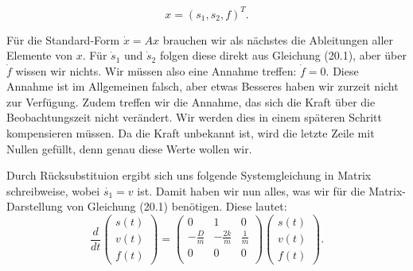 \[ 
 x = (s_1, s_2, f)^T.
\] 
  
Für die Standard-Form $\dot x = Ax$ brauchen wir als nächstes die Ableitungen aller Elemente von $x$. Für $\dot s_1$ und $\dot s_2$ folgen diese direkt aus Gleichung (20.1), aber über $\dot f$ wissen wir nichts. 
Wir müssen also eine Annahme treffen: $\dot f = 0$. Diese Annahme ist im Allgemeinen falsch, aber etwas Besseres haben wir zurzeit nicht zur Verfügung. 
Zudem treffen wir die Annahme, das sich die Kraft über die Beobachtungszeit nicht verändert.
Wir werden dies in einem späteren Schritt kompensieren müssen.
Da die Kraft unbekannt ist, wird die letzte Zeile mit Nullen gefüllt, denn genau diese Werte wollen wir. 


Durch Rücksubstituion ergibt sich uns folgende Systemgleichung in Matrix schreibweise, wobei $\dot {s_1}= v$ ist. Damit haben wir nun alles, was wir für die Matrix-Darstellung von Gleichung (20.1) benötigen. Diese lautet:
\begin{equation}
\frac{d}{dt} \left(\begin{array}{c} s(t) \\ v(t) \\ f(t) \end{array}\right) = \left(
 \begin{array}{ccc} 	
0 & 1& 0 \\ 
- \frac{D}{m} &-\frac{2k}{m} & \frac{1} {m}\\
0 & 0 & 0\\
\end{array}\right)  \left(\begin{array}{c} s(t)\\ v(t)\\ f(t) \end{array}\right).
\end{equation}












